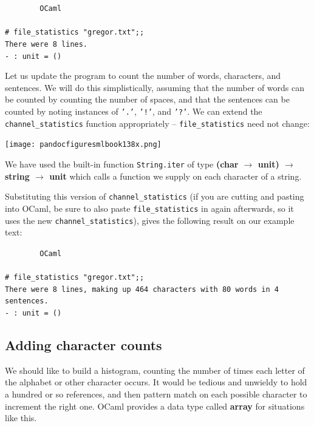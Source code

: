 \documentclass[]{book}
\newcommand{\smspace}{\vspace{4mm}}
\begin{document}
\smspace
\noindent\verb!        OCaml!\\
\noindent\\
\noindent\verb!# file_statistics "gregor.txt";;!\\
\noindent\verb!There were 8 lines.!\\
\noindent\verb!- : unit = ()!
\smspace

\noindent Let us update the program to count the number of words, characters, and sentences. We will do this simplistically, assuming that the number of words can be counted by counting the number of spaces, and that the sentences can be counted by noting instances of \texttt{'.'}, \texttt{'!'}, and \texttt{'?'}. We can extend the \texttt{channel\_statistics} function appropriately -- \texttt{file\_statistics} need not change:

\medskip
\begin{center}
\noindent\texttt{[image: pandocfiguresmlbook138x.png]}
\end{center}
\medskip

\noindent We have used the built-in function \texttt{String.iter} of type \textsf{\textbf{\textmd{(}char $\rightarrow$ unit\textmd{)} $\rightarrow$ string $\rightarrow$ unit}} which calls a function we supply on each character of a string.

Substituting this version of \texttt{channel\_statistics} (if you are cutting and pasting into OCaml, be sure to also paste \texttt{file\_statistics} in again afterwards, so it uses the new \texttt{channel\_statistics}), gives the following result on our example text:

\smspace
\noindent\verb!        OCaml!\\
\noindent\\
\noindent\verb!# file_statistics "gregor.txt";;!\\
\noindent\verb!There were 8 lines, making up 464 characters with 80 words in 4 sentences.!\\
\noindent\verb!- : unit = ()!
\smspace

\subsection*{Adding character counts}

We should like to build a histogram, counting the number of times each letter of the alphabet or other character occurs. It would be tedious and unwieldy to hold a hundred or so references, and then pattern match on each possible character to increment the right one. OCaml provides a data type called \textsf{\textbf{array}} for situations like this.
\end{document}

